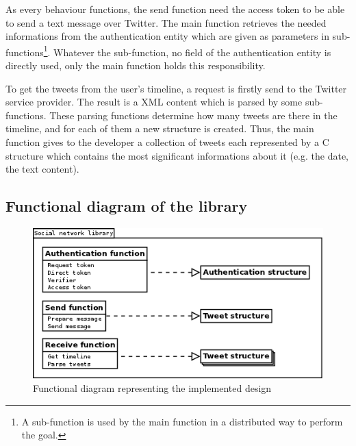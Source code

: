 As every behaviour functions, the send function need the access token to be able to send a text message over Twitter. The main function retrieves the needed informations from the authentication entity which are given as parameters in sub-functions\footnote{A sub-function is used by the main function in a distributed way to perform the goal.}. Whatever the sub-function, no field of the authentication entity is directly used, only the main function holds this responsibility.

To get the tweets from the user's timeline, a request is firstly send to the Twitter service provider. The result is a XML content which is parsed by some sub-functions. These parsing functions determine how many tweets are there in the timeline, and for each of them a new structure is created. Thus, the main function gives to the developer a collection of tweets each represented by a C structure which contains the most significant informations about it (e.g. the date, the text content).


\subsection{Functional diagram of the library}


\begin{figure}[h]
  \centering
  \includegraphics[scale=0.75]{images/functional_design.png}
  \caption{Functional diagram representing the implemented design}
\end{figure}


\clearpage
